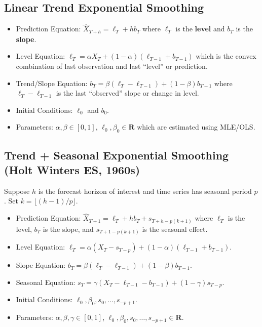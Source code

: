 \subsection*{Linear Trend Exponential Smoothing}
\begin{itemize}
    \item Prediction Equation: $ \hat{X}_{T+h}=\ell_T+h b_T $ where $ \ell_T $
          is the \textbf{level} and $ b_T $ is the \textbf{slope}.
    \item Level Equation: $ \ell_T=\alpha X_T+(1-\alpha)(\ell_{T-1}+b_{T-1}) $
          which is the convex combination of last observation and last ``level''
          or prediction.
    \item Trend/Slope Equation: $ b_T=\beta(\ell_T-\ell_{T-1})+(1-\beta)b_{T-1} $
          where $ \ell_T-\ell_{T-1} $ is the last ``observed'' slope or change in level.
    \item Initial Conditions: $ \ell_0 $ and $ b_0 $.
    \item Parameters: $ \alpha,\beta\in[0,1] $, $ \ell_0,\beta_0\in\mathbf{R} $
          which are estimated using MLE/OLS\@.
\end{itemize}

\subsection*{Trend + Seasonal Exponential Smoothing (Holt Winters ES, 1960s)}
Suppose $ h $ is the forecast horizon of interest and time series has seasonal
period $ p $. Set $ k=\lfloor (h-1)/p\rfloor $.
\begin{itemize}
    \item Prediction Equation: $ \hat{X}_{T+1}=\ell_T+h b_T+s_{T+h-p(k+1)} $
          where $ \ell_T $ is the level, $ b_T $ is the slope, and
          $ s_{T+1-p(k+1)} $ is the seasonal effect.
    \item Level Equation: $ \ell_T=\alpha(X_T-s_{T-p})+(1-\alpha)(\ell_{T-1}+b_{T-1}) $.
    \item Slope Equation: $ b_T=\beta(\ell_T-\ell_{T-1})+(1-\beta)b_{T-1} $.
    \item Seasonal Equation: $ s_T=\gamma(X_T-\ell_{T-1}-b_{T-1})+(1-\gamma)s_{T-p} $.
    \item Initial Conditions: $ \ell_0,\beta_0,s_0,\ldots,s_{-p+1} $.
    \item Parameters: $ \alpha,\beta,\gamma\in[0,1] $, $ \ell_0,\beta_0,s_0,\ldots,s_{-p+1}\in\mathbf{R} $.
\end{itemize}

